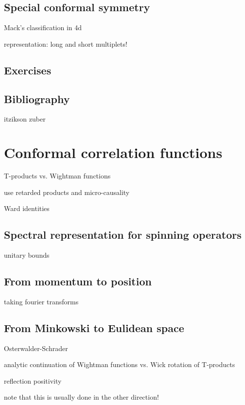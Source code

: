 \documentclass[a4paper,12pt]{article}
\numberwithin{equation}{section}
\begin{document}
\subsection{Special conformal symmetry}

Mack's classification in 4d


representation: long and short multiplets!


\subsection{Exercises}


\subsection{Bibliography}

itzikson zuber


\section{Conformal correlation functions}

T-products vs. Wightman functions

use retarded products and micro-causality


Ward identities


\subsection{Spectral representation for spinning operators}

unitary bounds

\subsection{From momentum to position}

taking fourier transforms

\subsection{From Minkowski to Eulidean space}

Osterwalder-Schrader

analytic continuation of Wightman functions vs. Wick rotation of T-products

reflection positivity

note that this is usually done in the other direction!
\end{document}
